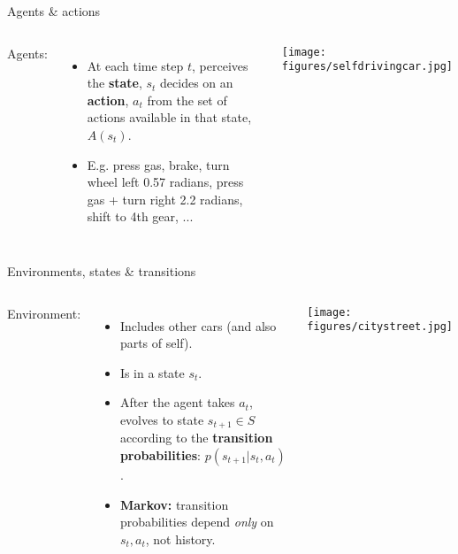 \documentclass{beamer}
\begin{document}
\begin{frame}{Agents \& actions}
\begin{columns}
Agents:
\begin{itemize}
    \item At each time step \(t\), perceives the \textbf{state}, \(s_t\) decides on an \textbf{action}, \(a_t\) from the set of actions available in that state, \(A(s_t)\).
    \item<2-> E.g. press gas, brake, turn wheel left 0.57 radians, press gas + turn right 2.2 radians, shift to 4th gear, ...
\end{itemize}
    \begin{center}
    \texttt{[image: figures/selfdrivingcar.jpg]}
    \end{center}
\end{columns}
\end{frame}

\begin{frame}{Environments, states \& transitions}
\begin{columns}
Environment:
\begin{itemize}
    \item Includes other cars (and also parts of self).
    \item<2-> Is in a state \(s_t\). 
    \item<3-> After the agent takes \(a_t\), evolves to state \(s_{t+1} \in S\) according to the \textbf{transition probabilities}: \(p(s_{t+1} | s_t, a_t)\).
    \item<4-> \textbf{Markov:} transition probabilities depend \emph{only} on \(s_t, a_t\), not history. 
\end{itemize}
    \begin{center}
    \texttt{[image: figures/citystreet.jpg]}
    \end{center}
\end{columns}
\end{frame}
\end{document}
